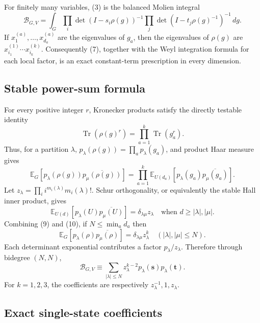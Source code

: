 \documentclass[10pt]{article}
\newcommand{\Tr}{\operatorname{Tr}}
\begin{document}
For finitely many variables, (3) is the balanced Molien integral
\begin{equation}
 \mathcal B_{G,V}
 =\int_G\prod_i\det(I-s_i\rho(g))^{-1}
         \prod_j\det(I-t_j\rho(g)^{-1})^{-1}\,dg.
\end{equation}
If $x^{(a)}_1,\ldots,x^{(a)}_{d_a}$ are the eigenvalues of $g_a$, then the
eigenvalues of $\rho(g)$ are $x^{(1)}_{i_1}\cdots x^{(k)}_{i_k}$.
Consequently (7), together with the Weyl integration formula for each local
factor, is an exact constant-term prescription in every dimension.

\subsection{Stable power-sum formula}

For every positive integer $r$, Kronecker products satisfy the directly
testable identity
\begin{equation}
 \Tr(\rho(g)^r)=\prod_{a=1}^k\Tr(g_a^r).
\end{equation}
Thus, for a partition $\lambda$,
$p_\lambda(\rho(g))=\prod_a p_\lambda(g_a)$, and product Haar measure gives
\begin{equation}
 \mathbb E_G\!\left[p_\lambda(\rho(g))
 \overline{p_\mu(\rho(g))}\right]
 =\prod_{a=1}^k\mathbb E_{U(d_a)}
 \left[p_\lambda(g_a)\overline{p_\mu(g_a)}\right].
\end{equation}
Let $z_\lambda=\prod_i i^{m_i(\lambda)}m_i(\lambda)!$. Schur orthogonality,
or equivalently the stable Hall inner product, gives
\begin{equation}
 \mathbb E_{U(d)}[p_\lambda(U)\overline{p_\mu(U)}]
 =\delta_{\lambda\mu}z_\lambda
 \quad\text{when }d\ge |\lambda|,|\mu|.
\end{equation}
Combining (9) and (10), if $N\le\min_a d_a$ then
\begin{equation}
 \mathbb E_G[p_\lambda(\rho)\overline{p_\mu(\rho)}]
 =\delta_{\lambda\mu}z_\lambda^k
 \quad (|\lambda|,|\mu|\le N).
\end{equation}
Each determinant exponential contributes a factor $p_\lambda/z_\lambda$.
Therefore through bidegree $(N,N)$,
\begin{equation}
 \boxed{\mathcal B_{G,V}\equiv
 \sum_{|\lambda|\le N}z_\lambda^{k-2}
 p_\lambda(\mathbf s)p_\lambda(\mathbf t).}
\end{equation}
For $k=1,2,3$, the coefficients are respectively
$z_\lambda^{-1},1,z_\lambda$.

\subsection{Exact single-state coefficients}
\end{document}
